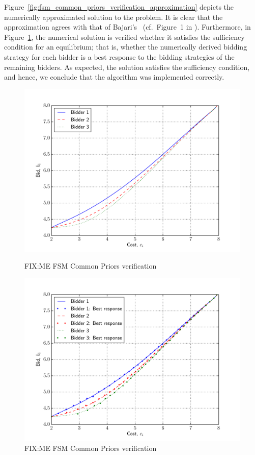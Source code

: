 Figure~\ref{fig:fsm_common_priors_verification_approximation} depicts the numerically approximated solution to the problem. It is clear that the approximation agrees with that of Bajari's~\cite{Bajari2001a} (cf.~Figure~1 in \cite{Bajari2001a}). Furthermore, in Figure~\ref{fig:fsm_common_priors_verification_sufficiency_approximation}, the numerical solution is verified whether it satisfies the sufficiency condition for an equilibrium; that is, whether the numerically derived bidding strategy for each bidder is a best response to the bidding strategies of the remaining bidders. As expected, the solution satisfies the sufficiency condition, and hence, we conclude that the algorithm was implemented correctly.

\begin{figure}[p!]
  \includegraphics[width=\figsize]{Approximation/Figures/fsm_common_priors_verification}
  \caption{FIX:ME FSM Common Priors verification}
  \label{fig:fsm_common_priors_verification_approximation}
  \vspace{10mm}
  \includegraphics[width=\figsize]{Approximation/Figures/fsm_common_priors_verification_sufficiency}
  \caption{FIX:ME FSM Common Priors verification}
  \label{fig:fsm_common_priors_verification_sufficiency_approximation}
\end{figure}

